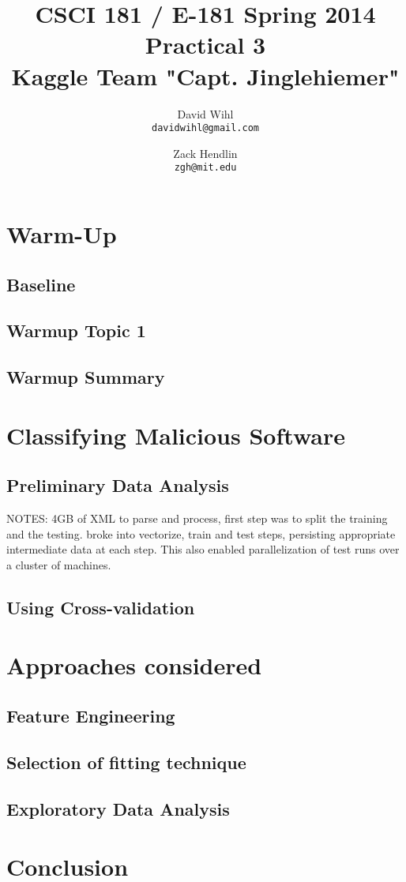 \documentclass[11pt, oneside]{article}   	%
\title{CSCI 181 / E-181 Spring 2014 Practical 3 \\ 
{\large Kaggle Team "Capt. Jinglehiemer"}
}
\author{
  David Wihl\\
  \texttt{davidwihl@gmail.com}
  \and
  Zack Hendlin\\
  \texttt{zgh@mit.edu} 
}
\begin{document}
\maketitle
\section*{Warm-Up}

\subsection*{Baseline}

\subsection*{Warmup Topic 1}

\subsection*{Warmup Summary}

\section*{Classifying Malicious Software}

\subsection*{Preliminary Data Analysis}

NOTES:
4GB of XML to parse and process, first step was to split the training and the testing. broke into vectorize, train and test steps, persisting appropriate intermediate data at each step. This also enabled parallelization of test runs over a cluster of machines.

\subsection*{Using Cross-validation}

\section*{Approaches considered}

\subsection*{Feature Engineering}

\subsection*{Selection of fitting technique}

\subsection*{Exploratory Data Analysis}

\section*{Conclusion}
\end{document}
